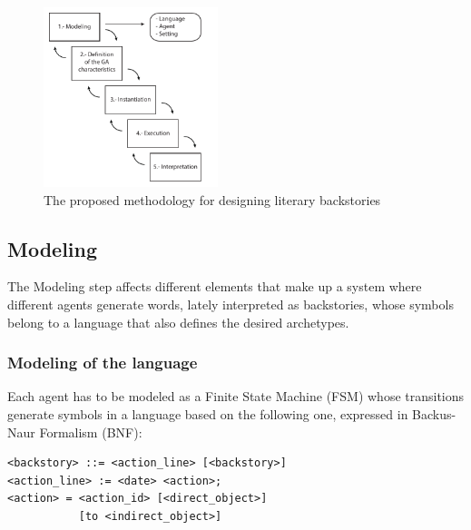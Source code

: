 \documentclass[letterpaper]{article}
\begin{document}
\begin{figure}[htb]
\centering
   \includegraphics[width=12pc] {img/methodology.pdf}
\caption{The proposed methodology for designing literary backstories}
\label{fig:methodology}
\end{figure}


\subsection{Modeling}

The Modeling step affects different elements that make up a system where different agents generate words, lately interpreted as backstories, whose symbols belong to a language that also defines the desired archetypes.


\subsubsection{Modeling of the language}

Each agent has to be modeled as a Finite State Machine (FSM) whose transitions generate symbols in a language based on the following one, expressed in Backus-Naur Formalism (BNF):

\begin{verbatim}
<backstory> ::= <action_line> [<backstory>]
<action_line> := <date> <action>;
<action> = <action_id> [<direct_object>]
           [to <indirect_object>]
\end{verbatim}
\end{document}
